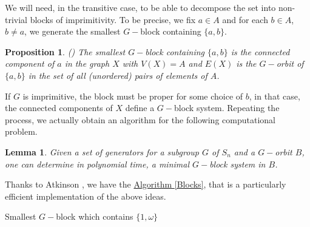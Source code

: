 \documentclass[12pt,a4paper]{book}
\theoremstyle{plain}
\newtheorem{proposition}{Proposition}
\newtheorem{lema}{Lemma}
\theoremstyle{definition}
\theoremstyle{remark}
\begin{document}
We will need, in the transitive case, to be able to decompose the set into non-trivial blocks of imprimitivity. To be precise, we fix $a \in A$ and 
for each $b \in A$, $b \neq a$, we generate the smallest $G-$block containing $\{a,b \}$.

\begin{proposition}  (\cite{Sims1967})
 The smallest $G-$block containing $\{a,b\}$ is the connected component of $a$ in the graph $X$ with $V(X)=A$ and $E(X)$ is the $G-$orbit of 
$\{a,b\}$ in the set of all (unordered) pairs of elements of $A$.
\end{proposition}

If $G$ is imprimitive, the block must be proper for some choice of $b$, in that case, the connected components of $X$ define a $G-$block system.
Repeating the process, we actually obtain an algorithm for the following computational problem.

\begin{lema}
 Given a set of generators for a subgroup $G$ of $S_n$ and a $G-$orbit $B$, one can determine in polynomial time, a minimal $G-$block system in $B$.
\end{lema}

Thanks to Atkinson \cite{Atkinson1975}, we have the \hyperlink{Blocks}{Algorithm \ref{Blocks}}, that is a particularly efficient implementation of 
the above ideas. 

\begin{algorithm}\label{Blocks}\hypertarget{blocks}{}
\caption{Smallest $G-$block which contains $\{1, \omega \}$}
\end{algorithm}
\end{document}
